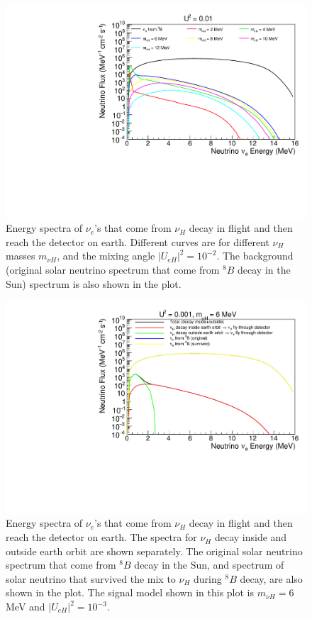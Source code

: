 \documentclass[%
 reprint,
 amsmath,amssymb,
 aps,
 prd,
floatfix,
twocolumn,
]{revtex4-1}
\begin{document}
\begin{figure}[!htbp]
\includegraphics[width=0.99\columnwidth]{../plots/DecayInFlightNuLEnergy_U0.01_AllMass_linXlogY.pdf}
\caption{Energy spectra of $\nu_e$'s that come from $\nu_H$ decay in flight and then reach the detector on earth. Different curves are for different $\nu_H$ masses $m_{\nu H}$, and the mixing angle $|U_{eH}|^2 = 10^{-2}$. 
The background (original solar neutrino spectrum that come from $^8 B$ decay in the Sun) spectrum is also shown in the plot.}
\label{fig:DecayInFlightSpectrum_U1em2_AllMass}
\end{figure}

\begin{figure}[!htbp]
\includegraphics[width=0.99\columnwidth]{../plots/DecayInFlightNuLEnergy_U0.001_M6.0_InsideOutside_linXlogY.pdf}
\caption{Energy spectra of $\nu_e$'s that come from $\nu_H$ decay in flight and then reach the detector on earth. The spectra for $\nu_H$ decay inside and outside earth orbit are shown separately. 
The original solar neutrino spectrum that come from $^8 B$ decay in the Sun, and spectrum of solar neutrino that survived the mix to $\nu_H$ during $^{8}B$ decay, are also shown in the plot. The signal model shown in this plot is $m_{\nu H} = 6$ MeV and $|U_{eH}|^2 = 10^{-3}$.}
\label{fig:DecayInFlightSpectrum_U1em3_M6} 
\end{figure}
\end{document}
